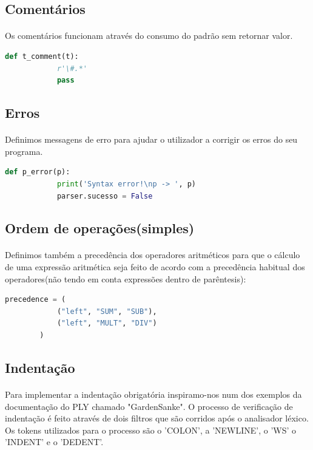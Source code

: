 \documentclass[11pt,a4paper]{report}
\begin{document}
    \subsection{Comentários}
    \paragraph{}
    Os comentários funcionam através do consumo do padrão sem retornar valor.
    \begin{lstlisting}[language=Python]
        def t_comment(t):
            r'\#.*'
            pass
    \end{lstlisting}

    \subsection{Erros}
    \paragraph{}
    Definimos messagens de erro para ajudar o utilizador a corrigir os erros do seu programa.
    \begin{lstlisting}[language=Python]
        def p_error(p):
            print('Syntax error!\np -> ', p)
            parser.sucesso = False
    \end{lstlisting}

    \subsection{Ordem de operações(simples)}
    \paragraph{}
    Definimos também a precedência dos operadores aritméticos para que o cálculo de uma expressão aritmética seja
     feito de acordo com a precedência habitual dos operadores(não tendo em conta expressões dentro de parêntesis):
    \begin{lstlisting}[language=Python]
        precedence = (
            ("left", "SUM", "SUB"),
            ("left", "MULT", "DIV")
        )
    \end{lstlisting}

    \subsection{Indentação}
    \paragraph{}
    Para implementar a indentação obrigatória inspiramo-nos num dos exemplos da documentação do PLY chamado "GardenSanke".
    O processo de verificação de indentação é feito através de dois filtros que são corridos após o analisador léxico.
    Os tokens utilizados para o processo são o 'COLON', a 'NEWLINE', o 'WS' o 'INDENT' e o 'DEDENT'.
\end{document}
